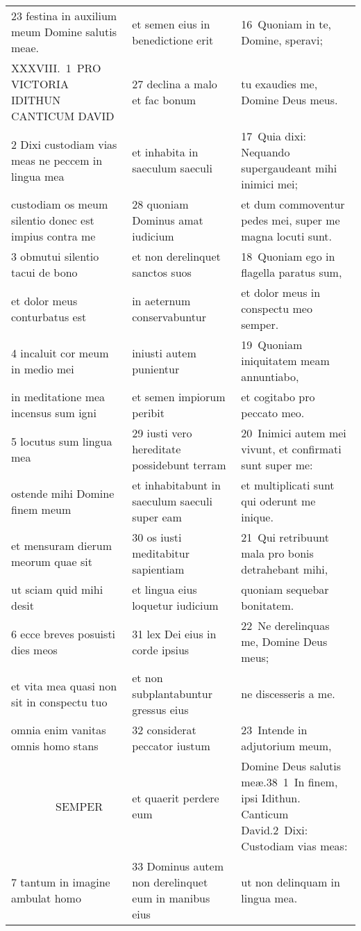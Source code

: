 \documentclass{article}
\begin{document}
\begin{longtable}{@{}p{}p{}p{}@{}}
23 festina in auxilium meum Domine salutis meae.	&	et semen eius in benedictione erit	&	16 Quoniam in te, Domine, speravi;	\\
XXXVIII. 1 PRO VICTORIA IDITHUN CANTICUM DAVID	&	27 declina a malo et fac bonum	&	tu exaudies me, Domine Deus meus.	\\
2 Dixi custodiam vias meas ne peccem in lingua mea	&	et inhabita in saeculum saeculi	&	17 Quia dixi: Nequando supergaudeant mihi inimici mei;	\\
custodiam os meum silentio donec est impius contra me	&	28 quoniam Dominus amat iudicium	&	et dum commoventur pedes mei, super me magna locuti sunt.	\\
3 obmutui silentio tacui de bono	&	et non derelinquet sanctos suos	&	18 Quoniam ego in flagella paratus sum,	\\
et dolor meus conturbatus est	&	in aeternum conservabuntur	&	et dolor meus in conspectu meo semper.	\\
4 incaluit cor meum in medio mei	&	iniusti autem punientur	&	19 Quoniam iniquitatem meam annuntiabo,	\\
in meditatione mea incensus sum igni	&	et semen impiorum peribit	&	et cogitabo pro peccato meo.	\\
5 locutus sum lingua mea	&	29 iusti vero hereditate possidebunt terram	&	20 Inimici autem mei vivunt, et confirmati sunt super me:	\\
ostende mihi Domine finem meum	&	et inhabitabunt in saeculum saeculi super eam	&	et multiplicati sunt qui oderunt me inique.	\\
et mensuram dierum meorum quae sit	&	30 os iusti meditabitur sapientiam	&	21 Qui retribuunt mala pro bonis detrahebant mihi,	\\
ut sciam quid mihi desit	&	et lingua eius loquetur iudicium	&	quoniam sequebar bonitatem.	\\
6 ecce breves posuisti dies meos	&	31 lex Dei eius in corde ipsius	&	22 Ne derelinquas me, Domine Deus meus;	\\
et vita mea quasi non sit in conspectu tuo	&	et non subplantabuntur gressus eius	&	ne discesseris a me.	\\
omnia enim vanitas omnis homo stans	&	32 considerat peccator iustum	&	23 Intende in adjutorium meum,	\\
    SEMPER	&	et quaerit perdere eum	&	Domine Deus salutis meæ.38 1 In finem, ipsi Idithun. Canticum David.2 Dixi: Custodiam vias meas:	\\
7 tantum in imagine ambulat homo	&	33 Dominus autem non derelinquet eum in manibus eius	&	ut non delinquam in lingua mea.	\\

\end{longtable}
\end{document}
